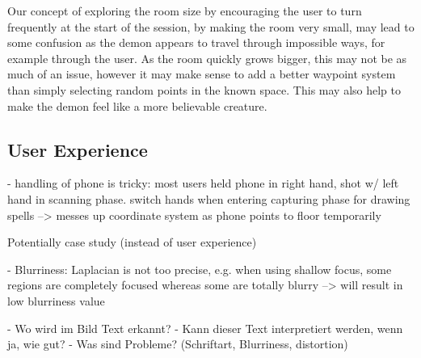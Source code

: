 Our concept of exploring the room size by encouraging the user to turn frequently at the start of the session, by making the room very small, may lead to some confusion as the demon appears to travel through impossible ways, for example through the user.
As the room quickly grows bigger, this may not be as much of an issue, however it may make sense to add a better waypoint system than simply selecting random points in the known space.
This may also help to make the demon feel like a more believable creature.

\subsection{User Experience}
- handling of phone is tricky: most users held phone in right hand, shot w/ left hand in scanning phase. switch hands when entering capturing phase for drawing spells --> messes up coordinate system as phone points to floor temporarily

Potentially case study (instead of user experience)

- Blurriness: Laplacian is not too precise, e.g. when using shallow focus, some regions are completely focused whereas some are totally blurry
--> will result in low blurriness value


- Wo wird im Bild Text erkannt?
- Kann dieser Text interpretiert werden, wenn ja, wie gut?
- Was sind Probleme? (Schriftart, Blurriness, distortion)

